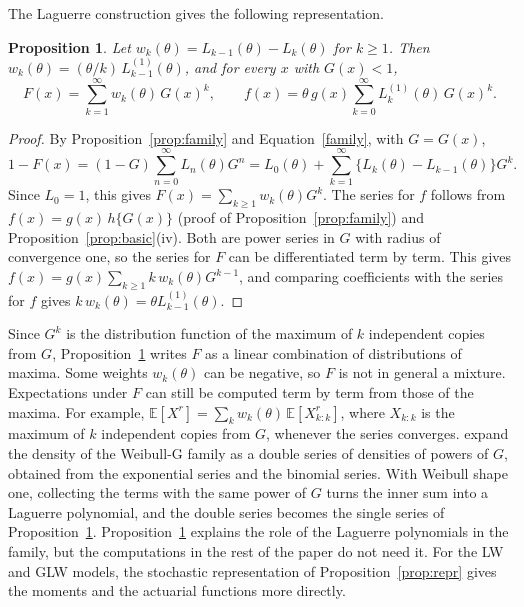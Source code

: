 \documentclass[12pt]{article}
\newcommand{\E}{\mathbb{E}}       %
\newtheorem{proposition}{Proposition}
\begin{document}
The Laguerre construction gives the following representation.

\begin{proposition}\label{prop:series}
Let $w_k(\theta)=L_{k-1}(\theta)-L_k(\theta)$ for $k\geq1$. Then $w_k(\theta)=(\theta/k)\,L_{k-1}^{(1)}(\theta)$, and for every $x$ with $G(x)<1$,
\[
F(x)=\sum_{k=1}^{\infty} w_k(\theta)\, G(x)^k,
\qquad
f(x)=\theta\, g(x)\sum_{k=0}^{\infty} L_k^{(1)}(\theta)\, G(x)^k.
\]
\end{proposition}

\begin{proof}
By Proposition~\ref{prop:family} and Equation~\eqref{family}, with $G=G(x)$,
\[
1-F(x)=(1-G)\sum_{n=0}^{\infty}L_n(\theta)G^n=L_0(\theta)+\sum_{k=1}^{\infty}\{L_k(\theta)-L_{k-1}(\theta)\}G^k.
\]
Since $L_0=1$, this gives $F(x)=\sum_{k\geq1}w_k(\theta)G^k$. The series for $f$ follows from $f(x)=g(x)\,h\{G(x)\}$ (proof of Proposition~\ref{prop:family}) and Proposition~\ref{prop:basic}(iv). Both are power series in $G$ with radius of convergence one, so the series for $F$ can be differentiated term by term. This gives $f(x)=g(x)\sum_{k\geq1}k\,w_k(\theta)G^{k-1}$, and comparing coefficients with the series for $f$ gives $k\,w_k(\theta)=\theta L_{k-1}^{(1)}(\theta)$.
\end{proof}

Since $G^k$ is the distribution function of the maximum of $k$ independent copies from $G$, Proposition~\ref{prop:series} writes $F$ as a linear combination of distributions of maxima. Some weights $w_k(\theta)$ can be negative, so $F$ is not in general a mixture. Expectations under $F$ can still be computed term by term from those of the maxima. For example, $\E[X^r]=\sum_k w_k(\theta)\,\E[X_{k:k}^r]$, where $X_{k:k}$ is the maximum of $k$ independent copies from $G$, whenever the series converges. \citet[Section~4]{bourguignon2014weibull} expand the density of the Weibull-G family as a double series of densities of powers of $G$, obtained from the exponential series and the binomial series. With Weibull shape one, collecting the terms with the same power of $G$ turns the inner sum into a Laguerre polynomial, and the double series becomes the single series of Proposition~\ref{prop:series}. Proposition~\ref{prop:series} explains the role of the Laguerre polynomials in the family, but the computations in the rest of the paper do not need it. For the LW and GLW models, the stochastic representation of Proposition~\ref{prop:repr} gives the moments and the actuarial functions more directly.
\end{document}
